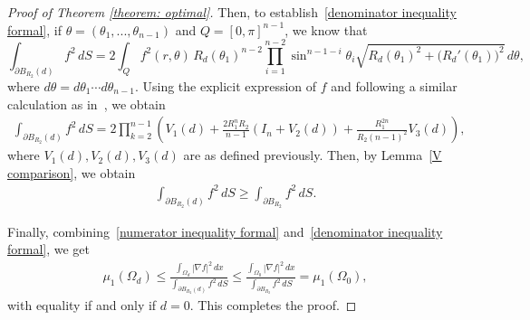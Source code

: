\documentclass[12pt,reqno]{amsart}
\numberwithin{equation}{section}
\numberwithin{theorem}{section}
\numberwithin{equation}{section}
\numberwithin{theorem}{section}
\begin{document}
\begin{proof} [Proof of Theorem \ref{theorem: optimal}]
\medskip
\noindent
Then, to establish~\eqref{denominator inequality formal},
if $\theta= (\theta_1,...,\theta_{n-1})$ and $Q=[0,\pi]^{n-1}$, we know that
\begin{equation*}
\int_{\partial B_{R_2}(d)} f^2 \, dS
=2 \int_{Q}
f^2(r, \theta)
\, R_d(\theta_1)^{n-2}
\prod_{i=1}^{n-2} \sin^{n-1-i}\!\theta_i
\sqrt{R_d(\theta_1)^2 + \big(R_d'(\theta_1)\big)^2}
\, d\theta,
\end{equation*}
where $d\theta= d\theta_1\cdots d\theta_{n-1}$.
Using the explicit expression of $f$ and following a similar calculation as in~\cite{ftouhi2022place}, we obtain
\begin{align}
      \int_{\partial B_{R_2}(d)} f^2 \, dS 
    = 
    2 \prod_{k=2}^{n-1} 
    \left(
        V_1(d)
        + \frac{2R_1^n R_2}{n-1} 
        ( I_n + V_2(d) )
        + \frac{R_1^{2n}}{R_2(n-1)^2} V_3(d)
    \right),
\end{align}
where $V_1(d), V_2(d), V_3(d)$ are as defined previously.  
Then, by Lemma~\ref{V comparison}, we obtain
\begin{align*}
    \int_{\partial B_{R_2}(d)} f^2 \, dS 
    \geq 
    \int_{\partial B_{R_2}} f^2 \, dS.
\end{align*}

\medskip
\noindent
Finally, combining~\eqref{numerator inequality formal} and~\eqref{denominator inequality formal}, we get
\begin{align*}
    \mu_1(\Omega_{d})
    \leq 
    \frac{\displaystyle \int_{\Omega_{d}} |\nabla f|^2 \, dx}
         {\displaystyle \int_{\partial B_{R_2}(d)} f^2 \, dS}
    \leq
    \frac{\displaystyle \int_{\Omega_{0}} |\nabla f|^2 \, dx}
         {\displaystyle \int_{\partial B_{R_2}} f^2 \, dS}
    = 
    \mu_1(\Omega_{0}),
\end{align*}
with equality if and only if $d = 0$.  
This completes the proof.
\end{proof}
\end{document}

